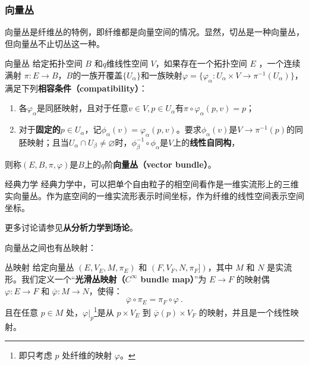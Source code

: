 \subsubsection{向量丛}



向量丛是纤维丛的特例，即纤维都是向量空间的情况。显然，切丛是一种向量丛，但向量丛不止切丛这一种。

\begin{definition}{向量丛}\label{def_Fibre_1}
给定拓扑空间 $B$ 和$q$维线性空间 $V$，如果存在一个拓扑空间 $E$ ，一个连续满射 $\pi:E\rightarrow B$，$B$的一族开覆盖$\{U_\alpha\}$和一族映射$\varphi=\{\varphi_\alpha: U_\alpha\times V\to \pi^{-1}(U_\alpha)\}$，满足下列\textbf{相容条件（compatibility）}：
\begin{enumerate}
\item 各$\varphi_\alpha$是同胚映射，且对于任意$v\in V, p\in U_\alpha$有$\pi\circ\varphi_\alpha(p, v)=p$；
\item 对于\textbf{固定的}$p\in U_\alpha$，记$\phi_\alpha(v)=\varphi_\alpha(p, v)$。要求$\phi_\alpha(v)$是$V\to \pi^{-1}(p)$的同胚映射；且当$U_\alpha\cap U_\beta\not=\varnothing$时，$\phi_\beta^{-1}\circ\phi_\alpha$是$V$上的\textbf{线性自同构}，
\end{enumerate}
则称$(E, B, \pi, \varphi)$是$B$上的$q$阶\textbf{向量丛（vector bundle）}。

\end{definition}






\begin{example}{经典力学}
经典力学中，可以把单个自由粒子的相空间看作是一维实流形上的三维实向量丛。作为底空间的一维实流形表示时间坐标，作为纤维的线性空间表示空间坐标。

更多讨论请参见\textbf{从分析力学到场论}。
\end{example}





向量丛之间也有丛映射：

\begin{definition}{丛映射}
给定向量丛 $(E, V_E, M, \pi_E)$ 和 $(F, V_F, N, \pi_F])$，其中 $M$ 和 $N$ 是实流形。我们定义一个“\textbf{光滑丛映射（$C^\infty$ bundle map）}”为 $E\rightarrow F$ 的映射偶 $\varphi: E\rightarrow F$ 和 $\overline{\varphi}: M\rightarrow N$，使得：
\begin{equation}
\overline{\varphi}\circ\pi_E=\pi_F\circ\varphi~.
\end{equation}
且在任意 $p\in M$ 处，$\varphi|_p$\footnote{即只考虑 $p$ 处纤维的映射 $\varphi$。}是从 $p\times V_E$ 到 $\overline{\varphi}(p)\times V_F$ 的映射，并且是一个线性映射。
\end{definition}





